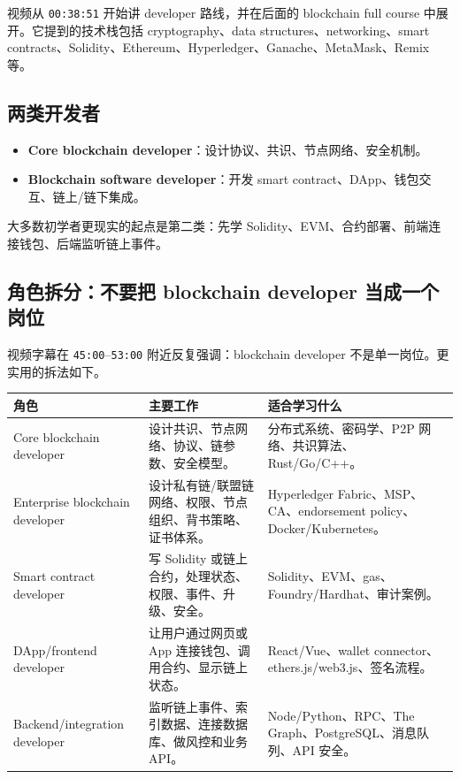 \documentclass[UTF8,11pt]{ctexart}
\newcommand{\term}[1]{\textbf{\sffamily #1}}
\newcommand{\timestamp}[1]{\textcolor{blue!50!black}{\texttt{#1}}}
\begin{document}
视频从 \timestamp{00:38:51} 开始讲 developer 路线，并在后面的 blockchain full course 中展开。它提到的技术栈包括 cryptography、data structures、networking、smart contracts、Solidity、Ethereum、Hyperledger、Ganache、MetaMask、Remix 等。

\subsection{两类开发者}

\begin{itemize}
  \item \term{Core blockchain developer}：设计协议、共识、节点网络、安全机制。
  \item \term{Blockchain software developer}：开发 smart contract、DApp、钱包交互、链上/链下集成。
\end{itemize}

大多数初学者更现实的起点是第二类：先学 Solidity、EVM、合约部署、前端连接钱包、后端监听链上事件。

\subsection{角色拆分：不要把 blockchain developer 当成一个岗位}

视频字幕在 \timestamp{45:00}--\timestamp{53:00} 附近反复强调：blockchain developer 不是单一岗位。更实用的拆法如下。

\begin{longtable}{>{\raggedright\arraybackslash}p{3.4cm}>{\raggedright\arraybackslash}p{5.1cm}>{\raggedright\arraybackslash}p{5.2cm}}
\toprule
\textbf{角色} & \textbf{主要工作} & \textbf{适合学习什么} \\
\midrule
\endhead
Core blockchain developer & 设计共识、节点网络、协议、链参数、安全模型。 & 分布式系统、密码学、P2P 网络、共识算法、Rust/Go/C++。 \\
Enterprise blockchain developer & 设计私有链/联盟链网络、权限、节点组织、背书策略、证书体系。 & Hyperledger Fabric、MSP、CA、endorsement policy、Docker/Kubernetes。 \\
Smart contract developer & 写 Solidity 或链上合约，处理状态、权限、事件、升级、安全。 & Solidity、EVM、gas、Foundry/Hardhat、审计案例。 \\
DApp/frontend developer & 让用户通过网页或 App 连接钱包、调用合约、显示链上状态。 & React/Vue、wallet connector、ethers.js/web3.js、签名流程。 \\
Backend/integration developer & 监听链上事件、索引数据、连接数据库、做风控和业务 API。 & Node/Python、RPC、The Graph、PostgreSQL、消息队列、API 安全。 \\
\bottomrule
\end{longtable}
\end{document}
